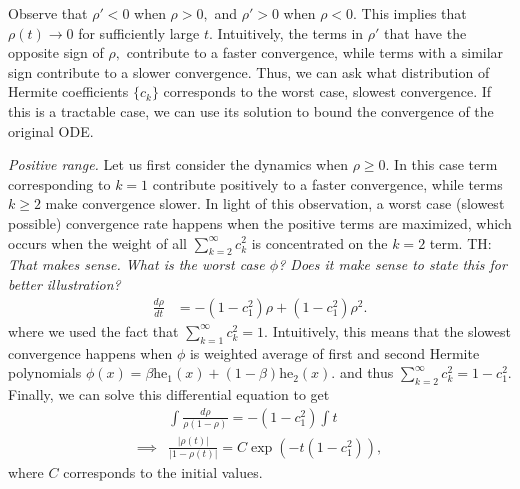 \documentclass[twoside]{article}
\newcommand{\he}{\mathrm{he}}
\theoremstyle{definition}
\newcommand{\thomas}[1]{{\color{blue}TH:  \textit{#1}}}
\begin{document}
Observe that $\rho'<0$ when $\rho>0,$ and $\rho'>0$ when $\rho<0.$ This implies that $\rho(t) \to 0$ for sufficiently large $t.$ Intuitively, the terms in $\rho'$ that have the opposite sign of $\rho,$ contribute to a faster convergence, while terms with a similar sign contribute to a slower convergence. Thus, we can ask what distribution of Hermite coefficients $\{c_k\}$ corresponds to the worst case, slowest convergence. If this is a tractable case, we can use its solution to bound the convergence of the original ODE. 

\textit{Positive range.}
Let us first consider the dynamics when $\rho\ge 0.$ 
In this case term corresponding to $k=1$ contribute positively to a faster convergence, while terms $k\ge 2$ make convergence slower. In light of this observation, a worst case (slowest possible) convergence rate happens when the positive terms are maximized, which occurs when the weight of all $\sum_{k=2}^\infty c_k^2 $ is concentrated on the $k=2$ term. \thomas{That makes sense. What is the worst case $\phi$? Does it make sense to state this for better illustration?}
\begin{align*}
    \frac{d\rho}{dt} &=  -(1-c_1^2)\rho + (1-c_1^2) \rho^2.
\end{align*}
where we used the fact that $\sum_{k=1}^\infty c_k^2 = 1.$ Intuitively, this means that the slowest convergence happens when $\phi$ is weighted average of first and second Hermite polynomials $\phi(x) = \beta \he_1 (x) + (1-\beta) \he_2 (x).$
and thus $\sum_{k=2}^\infty c_k^2 = 1-c_1^2. $ Finally, we can solve this differential equation to get
\begin{align*}
    &\int \frac{d\rho}{\rho(1-\rho)} = - (1-c_1^2)\int t \\
    \implies &\frac{|\rho(t)|}{|1-\rho(t)|} = C \exp(-t(1-c_1^2)),
\end{align*}
where $C$ corresponds to the initial values. 
\end{document}
